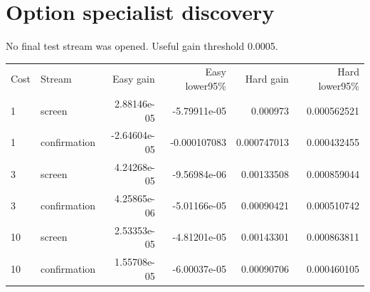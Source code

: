 \documentclass{article}
\begin{document}
\section*{Option specialist discovery}
No final test stream was opened. Useful gain threshold 0.0005.
\begin{tabular}{llrrrr}
Cost & Stream & Easy gain & Easy lower95\% & Hard gain & Hard lower95\% \\
1 & screen & 2.88146e-05 & -5.79911e-05 & 0.000973 & 0.000562521 \\
1 & confirmation & -2.64604e-05 & -0.000107083 & 0.000747013 & 0.000432455 \\
3 & screen & 4.24268e-05 & -9.56984e-06 & 0.00133508 & 0.000859044 \\
3 & confirmation & 4.25865e-06 & -5.01166e-05 & 0.00090421 & 0.000510742 \\
10 & screen & 2.53353e-05 & -4.81201e-05 & 0.00143301 & 0.000863811 \\
10 & confirmation & 1.55708e-05 & -6.00037e-05 & 0.00090706 & 0.000460105 \\
\end{tabular}
\end{document}
